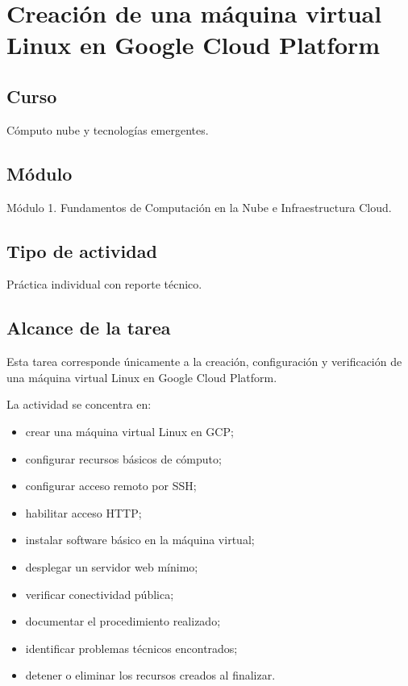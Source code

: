 \documentclass[
  coursetitle={Cómputo Nube y Tecnologías Emergentes},
  coursehours={96},
  coursedate={Verano 2026},
  doctype={Tarea 2},
  otherlangs={english,french},
  authorname={Lázaro},
  authorsurname={Bustio-Martínez},
  authortitle={PhD},
  role={Profesor Investigador},
  email={lbustio@inaoe.mx},
  phone={5559504000},
  ext={7459},
  institution={Instituto Nacional de Astrofísica, Óptica y Electrónica (INAOE)},
  department={Maestría en Ciencias en Tecnologías de Seguridad},
  address={Luis Enrique Erro 1, Sta. Ma. Tonantzintla, San Andrés Cholula, CP 72840, Puebla, México},
  margin={0.5in}
]{../../../lbustio_lecture_notes}
\begin{document}
\IberoCover

\section{Creación de una máquina virtual Linux en Google Cloud Platform}
\label{sec:tarea2-vm-gcp}

\subsection{Curso}
\label{sec:tarea2-curso}

Cómputo nube y tecnologías emergentes.

\subsection{Módulo}
\label{sec:tarea2-modulo}

Módulo 1. Fundamentos de Computación en la Nube e Infraestructura Cloud.

\subsection{Tipo de actividad}
\label{sec:tarea2-tipo-actividad}

Práctica individual con reporte técnico.

\subsection{Alcance de la tarea}
\label{sec:tarea2-alcance}

Esta tarea corresponde únicamente a la creación, configuración y verificación de una máquina virtual Linux en Google Cloud Platform.

La actividad se concentra en:

\begin{itemize}
  \item crear una máquina virtual Linux en GCP;
  \item configurar recursos básicos de cómputo;
  \item configurar acceso remoto por SSH;
  \item habilitar acceso HTTP;
  \item instalar software básico en la máquina virtual;
  \item desplegar un servidor web mínimo;
  \item verificar conectividad pública;
  \item documentar el procedimiento realizado;
  \item identificar problemas técnicos encontrados;
  \item detener o eliminar los recursos creados al finalizar.
\end{itemize}
\end{document}
